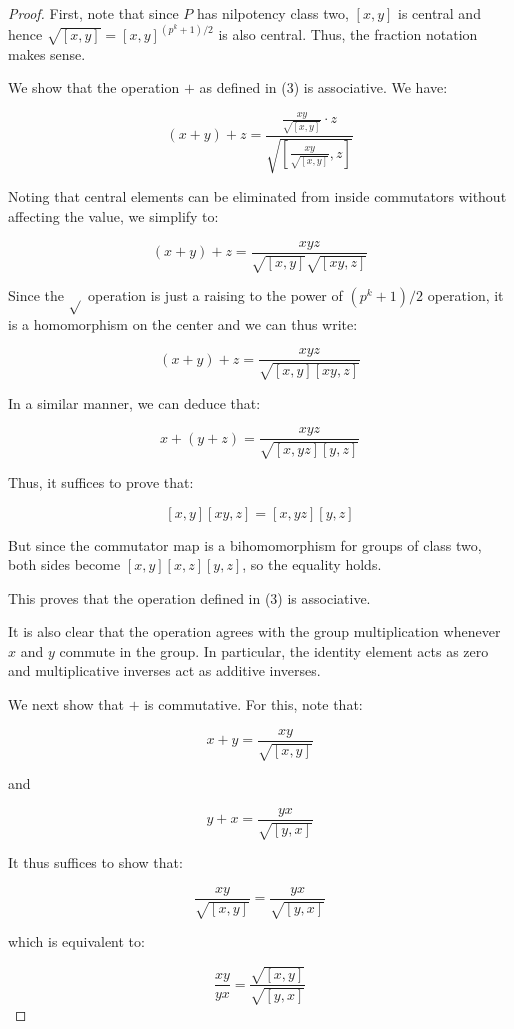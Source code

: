 \documentclass[10pt]{amsart}
\begin{document}
\begin{proof}
  First, note that since $P$ has nilpotency class two, $[x,y]$ is
  central and hence $\sqrt{[x,y]} = [x,y]^{(p^k+1)/2}$ is also
  central. Thus, the fraction notation makes sense.

  We show that the operation $+$ as defined in (3) is associative. We have:

  $$(x + y) + z = \frac{\frac{xy}{\sqrt{[x,y]}} \cdot z}{\sqrt{\left[\frac{xy}{\sqrt{[x,y]}},z\right]}}$$

  Noting that central elements can be eliminated from inside
  commutators without affecting the value, we simplify to:

  $$(x + y) + z = \frac{xyz}{\sqrt{[x,y]}\sqrt{[xy,z]}}$$

  Since the $\sqrt{}$ operation is just a raising to the power of $(p^k
  + 1)/2$ operation, it is a homomorphism on the center and we can thus write:

  $$(x + y) + z = \frac{xyz}{\sqrt{[x,y][xy,z]}}$$

  In a similar manner, we can deduce that:

  $$x + (y + z) = \frac{xyz}{\sqrt{[x,yz][y,z]}}$$

  Thus, it suffices to prove that:

  $$[x,y][xy,z] = [x,yz][y,z]$$

  But since the commutator map is a bihomomorphism for groups of class
  two, both sides become $[x,y][x,z][y,z]$, so the equality holds.

  This proves that the operation defined in (3) is associative.

  It is also clear that the operation agrees with the group
  multiplication whenever $x$ and $y$ commute in the group. In
  particular, the identity element acts as zero and multiplicative
  inverses act as additive inverses.

  We next show that $+$ is commutative. For this, note that:

  $$x + y = \frac{xy}{\sqrt{[x,y]}}$$

  and

  $$y + x = \frac{yx}{\sqrt{[y,x]}}$$

  It thus suffices to show that:

  $$\frac{xy}{\sqrt{[x,y]}} = \frac{yx}{\sqrt{[y,x]}}$$

  which is equivalent to:

  $$\frac{xy}{yx} = \frac{\sqrt{[x,y]}}{\sqrt{[y,x]}}$$


\end{proof}
\end{document}

